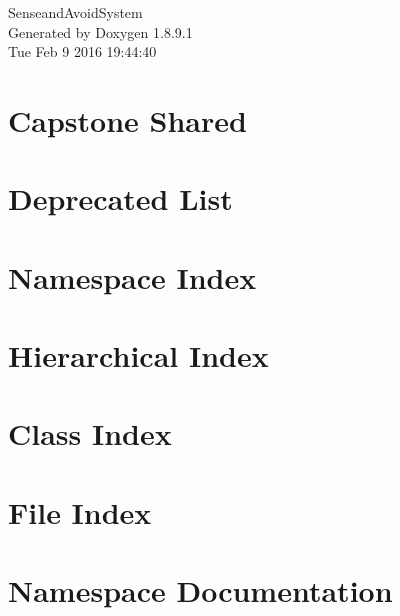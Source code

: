 \documentclass[twoside]{book}
\newcommand{\+}{\discretionary{\mbox{\scriptsize$\hookleftarrow$}}{}{}}
\newcommand{\clearemptydoublepage}{%
  \newpage{\pagestyle{empty}\cleardoublepage}%
}
\begin{document}
\hypersetup{pageanchor=false,
             bookmarks=true,
             bookmarksnumbered=true,
             pdfencoding=unicode
            }
\begin{titlepage}
\vspace*{7cm}
\begin{center}%
{\Large Senseand\+Avoid\+System }\\
\vspace*{1cm}
{\large Generated by Doxygen 1.8.9.1}\\
\vspace*{0.5cm}
{\small Tue Feb 9 2016 19:44:40}\\
\end{center}
\end{titlepage}
\clearemptydoublepage
\tableofcontents
\clearemptydoublepage
{}
\hypersetup{pageanchor=true}

\chapter{Capstone Shared}
\label{md__home_frank_dev_cpe402_saas_lib_gp_capstone-shared__r_e_a_d_m_e}
\hypertarget{md__home_frank_dev_cpe402_saas_lib_gp_capstone-shared__r_e_a_d_m_e}{}

\chapter{Deprecated List}
\label{deprecated}
\hypertarget{deprecated}{}

\chapter{Namespace Index}

\chapter{Hierarchical Index}

\chapter{Class Index}

\chapter{File Index}

\chapter{Namespace Documentation}







\end{document}

